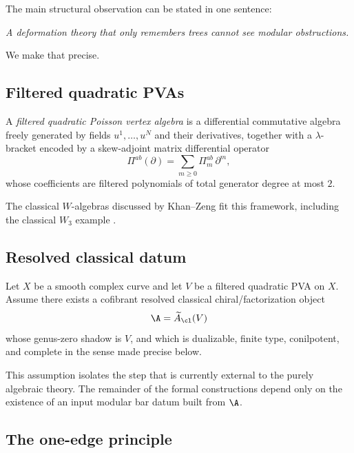 The main structural observation can be stated in one sentence:

\begin{center}
\emph{A deformation theory that only remembers trees cannot see modular obstructions.}
\end{center}

We make that precise.

\subsection{Filtered quadratic PVAs}

\begin{definition}
A \emph{filtered quadratic Poisson vertex algebra} is a differential commutative algebra
freely generated by fields $u^1,\dots,u^N$ and their derivatives, together with a
$\lambda$-bracket encoded by a skew-adjoint matrix differential operator
\[
\Pi^{ab}(\partial)=\sum_{m\ge 0}\Pi^{ab}_m\,\partial^m,
\]
whose coefficients are filtered polynomials of total generator degree at most $2$.
\end{definition}

The classical $W$-algebras discussed by Khan--Zeng fit this framework, including the
classical $W_3$ example \cite{KZ25}.

\subsection{Resolved classical datum}

\begin{assumption}
Let $X$ be a smooth complex curve and let $V$ be a filtered quadratic PVA on $X$.
Assume there exists a cofibrant resolved classical chiral/factorization object
\[
\A=\widetilde A_{\cl}(V)
\]
whose genus-zero shadow is $V$, and which is dualizable, finite type, conilpotent,
and complete in the sense made precise below.
\end{assumption}

\begin{remark}
This assumption isolates the step that is currently external to the purely algebraic theory.
The remainder of the formal constructions depend only on the existence of an input
modular bar datum built from $\A$.
\end{remark}

\subsection{The one-edge principle}

